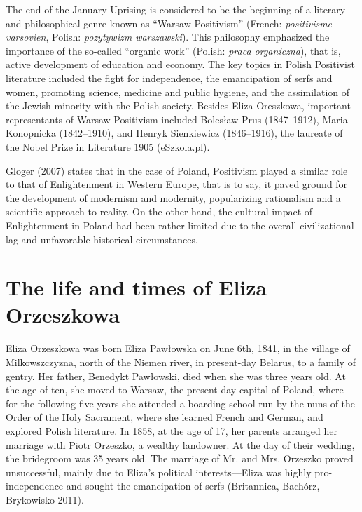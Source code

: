 The end of the January Uprising is considered to be the beginning of a literary and philosophical genre known as ``Warsaw Positivism'' (French: \textit{positivisme varsovien}, Polish: \textit{pozytywizm warszawski}).
This philosophy emphasized the importance of the so-called ``organic work'' (Polish: \textit{praca organiczna}), that is, active development of education and economy.
The key topics in Polish Positivist literature included the fight for independence, the emancipation of serfs and women, promoting science, medicine and public hygiene, and the assimilation of the Jewish minority with the Polish society.
Besides Eliza Oreszkowa, important representants of Warsaw Positivism included Bolesław Prus (1847--1912), Maria Konopnicka (1842--1910), and Henryk Sienkiewicz (1846--1916), the laureate of the Nobel Prize in Literature 1905
(eSzkola.pl).

Gloger (2007) states that in the case of Poland, Positivism played a similar role to that of Enlightenment in Western Europe, that is to say, it paved ground for the development of modernism and modernity, popularizing rationalism and a scientific approach to reality. On the other hand, the cultural impact of Enlightenment in Poland had been rather limited due to the overall civilizational lag and unfavorable historical circumstances.

\section{The life and times of Eliza Orzeszkowa}

Eliza Orzeszkowa was born Eliza Pawłowska on June 6th, 1841, in the village of Milkowszczyzna, north of the Niemen river, in present-day Belarus, to a family of gentry.
Her father, Benedykt Pawłowski, died when she was three years old. 
At the age of ten, she moved to Warsaw, the present-day capital of Poland, where for the following five years she attended a boarding school run by the nuns of the Order of the Holy Sacrament, where she learned French and German, and explored Polish literature.
In 1858, at the age of 17, her parents arranged her marriage with Piotr Orzeszko, a wealthy landowner.
At the day of their wedding, the bridegroom was 35 years old.
The marriage of Mr. and Mrs. Orzeszko proved unsuccessful, mainly due to Eliza's political interests---Eliza was highly pro-independence and sought the emancipation of serfs (Britannica, Bachórz, Brykowisko 2011).

